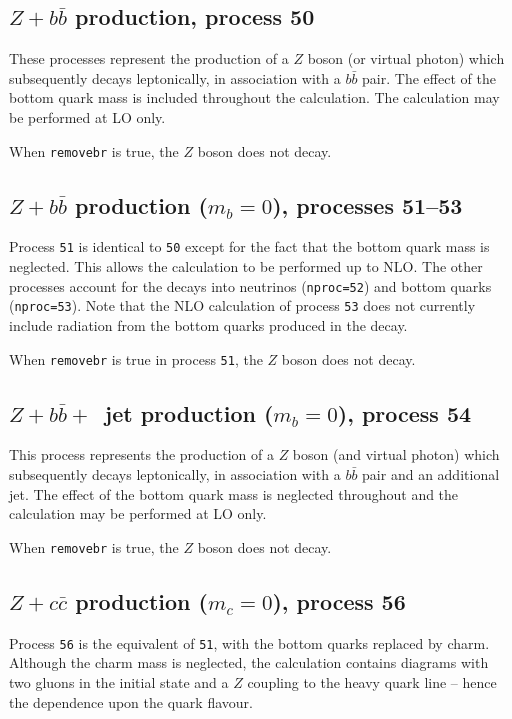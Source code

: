\documentclass[12pt]{article}
\begin{document}
\subsection{$Z+b{\bar b}$ production, process 50}
\label{subsec:zbb}

These processes represent the production of a $Z$ boson (or virtual photon)
which subsequently decays leptonically, in association
with a $b{\bar b}$ pair. The effect of
the bottom quark mass is included throughout the calculation.  
The calculation may be performed at LO only.

When {\tt removebr} is true, the $Z$ boson does not decay.

\subsection{$Z+b{\bar b}$ production ($m_b=0$), processes 51--53}
\label{subsec:zbbmassless}

Process {\tt 51} is identical to {\tt 50} except for the fact
that the bottom quark mass is neglected. This allows the calculation to be
performed up to NLO. The other processes account for the decays into
neutrinos ({\tt nproc=52}) and bottom quarks ({\tt nproc=53}). Note that
the NLO calculation of process {\tt 53} does not currently 
include radiation from the
bottom quarks produced in the decay.

When {\tt removebr} is true in process {\tt 51}, the $Z$ boson does not decay.

\subsection{$Z+b{\bar b}+$~jet production ($m_b=0$), process 54}
\label{subsec:zbbjetmassless}

This process represents the production of a $Z$ boson (and virtual photon)
which subsequently decays leptonically, in association
with a $b{\bar b}$ pair and an additional jet.
The effect of the bottom quark mass is neglected throughout
and the calculation may be performed at LO only.

When {\tt removebr} is true, the $Z$ boson does not decay.

\subsection{$Z+c{\bar c}$ production ($m_c=0$), process 56}
\label{subsec:zccmassless}

Process {\tt 56} is the equivalent of {\tt 51}, with the bottom quarks
replaced by charm. Although the charm mass is neglected, the calculation
contains diagrams with two gluons in the initial state and a
$Z$ coupling to the heavy quark line -- hence the dependence upon the quark
flavour.
\end{document}
